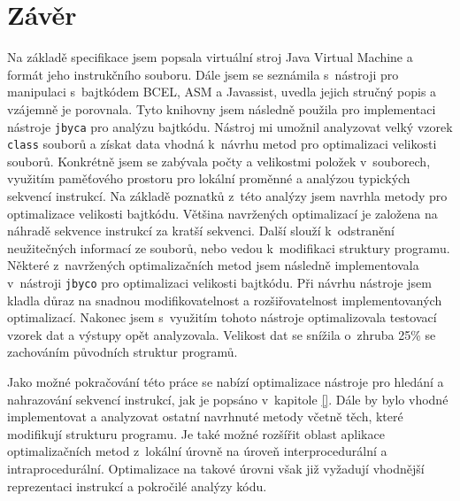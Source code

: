 \chapter{Závěr}\label{Conclusion}


Na základě specifikace \cite{Lindholm:JVM} jsem popsala virtuální stroj Java Virtual Machine a formát jeho instrukčního souboru.  Dále jsem se seznámila s~nástroji pro manipulaci s~bajtkódem BCEL, ASM a Javassist, uvedla jejich stručný popis a vzájemně je porovnala. Tyto knihovny jsem následně použila pro implementaci nástroje \texttt{jbyca} pro analýzu bajtkódu. Nástroj mi umožnil analyzovat velký vzorek \texttt{class} souborů a získat data vhodná k~návrhu metod pro optimalizaci velikosti souborů. Konkrétně jsem se zabývala počty a velikostmi položek v~souborech, využitím paměťového prostoru pro lokální proměnné a analýzou typických sekvencí instrukcí. Na základě poznatků z~této analýzy jsem navrhla metody pro optimalizace velikosti bajtkódu. Většina navržených optimalizací je založena na náhradě sekvence instrukcí za kratší sekvenci. Další slouží k~odstranění neužitečných informací ze souborů, nebo vedou k~modifikaci struktury programu. Některé z~navržených optimalizačních metod jsem následně implementovala v~nástroji \texttt{jbyco} pro optimalizaci velikosti bajtkódu. Při návrhu nástroje jsem kladla důraz na snadnou modifikovatelnost a rozšiřovatelnost implementovaných optimalizací. Nakonec jsem s~využitím tohoto nástroje optimalizovala testovací vzorek dat a výstupy opět analyzovala. Velikost dat se snížila o~zhruba 25\% se zachováním původních struktur programů.

Jako možné pokračování této práce se nabízí optimalizace nástroje pro hledání a nahrazování sekvencí instrukcí, jak je popsáno v~kapitole \ref{}.
Dále by bylo vhodné implementovat a analyzovat ostatní navrhnuté metody včetně těch, které modifikují strukturu programu. Je také možné rozšířit oblast aplikace optimalizačních metod z~lokální úrovně na úroveň interprocedurální a intraprocedurální. Optimalizace na takové úrovni však již vyžadují vhodnější reprezentaci instrukcí a pokročilé analýzy kódu.


